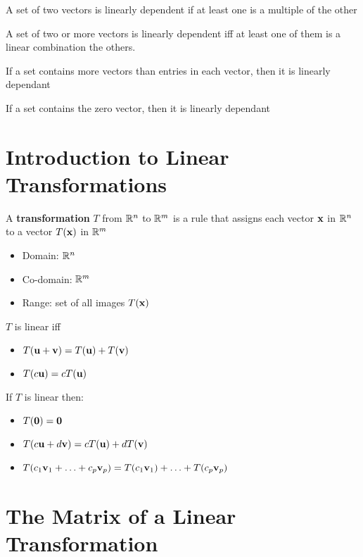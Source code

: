 \documentclass{report}
\begin{document}
A set of two vectors is linearly dependent if at least one is a multiple of the other

\begin{theorem}
\end{theorem}
A set of two or more vectors is linearly dependent iff at least one of them is a linear combination the others.

\begin{theorem}
\end{theorem}
If a set contains more vectors than entries in each vector, then it is linearly dependant 

\begin{theorem}
\end{theorem}
If a set contains the zero vector, then it is linearly dependant 

\section{Introduction to Linear Transformations}

A \textbf{transformation} $T$ from $\mathbb{R}^n$ to $\mathbb{R}^m$ is a rule that assigns each vector $\mathbf{x}$ in 
$\mathbb{R}^n$ to a vector $T(\mathbf{x})$ in $\mathbb{R}^m$
\begin{itemize}
    \item Domain: $\mathbb{R}^n$
    \item Co-domain: $\mathbb{R}^m$
    \item Range: set of all images $T(\mathbf{x})$
\end{itemize}

\begin{definition}
    $T$ is linear iff \begin{itemize}
        \item $T(\mathbf{u} + \mathbf{v}) = T(\mathbf{u}) + T(\mathbf{v})$
        \item $T(c\mathbf{u}) = c T(\mathbf{u})$
    \end{itemize}
\end{definition}

If $T$ is linear then:
\begin{itemize}
    \item $T(\mathbf{0}) = \mathbf{0}$
    \item $T(c\mathbf{u} + d\mathbf{v}) = cT(\mathbf{u}) + dT(\mathbf{v})$
    \item $T(c_1\mathbf{v}_1 + \ldots + c_p\mathbf{v}_p) = T(c_1\mathbf{v}_1) + \ldots + T(c_p\mathbf{v}_p)$
\end{itemize}

\section{The Matrix of a Linear Transformation}
\end{document}
